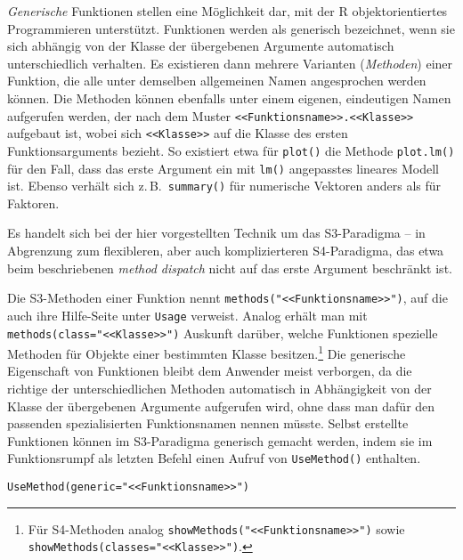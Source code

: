 \emph{Generische} Funktionen stellen eine Möglichkeit dar, mit der R objektorientiertes Programmieren unterstützt. Funktionen werden als generisch bezeichnet, wenn sie sich abhängig von der Klasse der übergebenen Argumente automatisch unterschiedlich verhalten. Es existieren dann mehrere Varianten (\emph{Methoden}) einer Funktion, die alle unter demselben allgemeinen Namen angesprochen werden können. Die Methoden können ebenfalls unter einem eigenen, eindeutigen Namen aufgerufen werden, der nach dem Muster \lstinline!<<Funktionsname>>.<<Klasse>>! aufgebaut ist, wobei sich \lstinline!<<Klasse>>! auf die Klasse des ersten Funktionsarguments bezieht. So existiert etwa für \lstinline!plot()! die Methode \lstinline!plot.lm()! für den Fall, dass das erste Argument ein mit \lstinline!lm()! angepasstes lineares Modell ist. Ebenso verhält sich z.\,B.\ \lstinline!summary()! für numerische Vektoren anders als für Faktoren.

Es handelt sich bei der hier vorgestellten Technik um das S3-Paradigma -- in Abgrenzung zum flexibleren, aber auch komplizierteren S4-Paradigma, das etwa beim beschriebenen \emph{method dispatch} nicht auf das erste Argument beschränkt ist.

Die S3-Methoden einer Funktion nennt \lstinline!methods("<<Funktionsname>>")!, auf die auch ihre Hilfe-Seite unter \lstinline!Usage! verweist. Analog erhält man mit \lstinline!methods(class="<<Klasse>>")! Auskunft darüber, welche Funktionen spezielle Methoden für Objekte einer bestimmten Klasse besitzen.\footnote{Für S4-Methoden analog \lstinline!showMethods("<<Funktionsname>>")! sowie \lstinline!showMethods(classes="<<Klasse>>")!.} Die generische Eigenschaft von Funktionen bleibt dem Anwender meist verborgen, da die richtige der unterschiedlichen Methoden automatisch in Abhängigkeit von der Klasse der übergebenen Argumente aufgerufen wird, ohne dass man dafür den passenden spezialisierten Funktionsnamen nennen müsste. Selbst erstellte Funktionen können im S3-Paradigma generisch gemacht werden, indem sie im Funktionsrumpf als letzten Befehl einen Aufruf von \lstinline!UseMethod()! enthalten.
\begin{lstlisting}
UseMethod(generic="<<Funktionsname>>")
\end{lstlisting}

